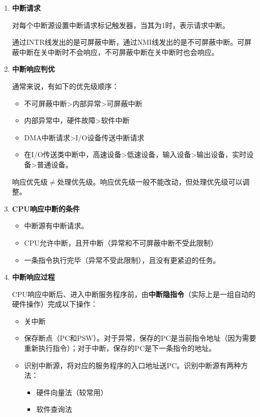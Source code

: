 \documentclass[12pt, a4paper, oneside]{ctexart}
\begin{document}
\begin{enumerate}
  \item {\bf 中断请求}
  
  对每个中断源设置中断请求标记触发器，当其为1时，表示请求中断。

  通过INTR线发出的是可屏蔽中断，通过NMI线发出的是不可屏蔽中断。可屏蔽中断在关中断时不会响应，不可屏蔽中断在关中断时也会响应。

  \item {\bf 中断响应判优}
  
  通常来说，有如下的优先级顺序：
  \begin{itemize}
    \item 不可屏蔽中断>内部异常>可屏蔽中断
    \item 内部异常中，硬件故障>软件中断
    \item DMA中断请求>I/O设备传送中断请求
    \item 在I/O传送类中断中，高速设备>低速设备，输入设备>输出设备，实时设备>普通设备。
  \end{itemize}

  响应优先级$\neq$处理优先级。响应优先级一般不能改动，但处理优先级可以调整。

  \item {\bf CPU响应中断的条件}
  
  \begin{itemize}
    \item 中断源有中断请求。
    \item CPU允许中断，且开中断（异常和不可屏蔽中断不受此限制）
    \item 一条指令执行完毕（异常不受此限制），且没有更紧迫的任务。
  \end{itemize}

  \item {\bf 中断响应过程}
  
  CPU响应中断后、进入中断服务程序前，由\textbf{中断隐指令}（实际上是一组自动的硬件操作）完成以下操作：
  \begin{itemize}
    \item 关中断
    \item 保存断点（PC和PSW）。对于异常，保存的PC是当前指令地址（因为需要重新执行指令）；对于中断，保存的PC是下一条指令的地址。
    \item 识别中断源，将对应的服务程序的入口地址送PC。识别中断源有两种方法：
    \begin{itemize}
      \item 硬件向量法（较常用）
      \item 软件查询法
    \end{itemize}
  \end{itemize}


\end{enumerate}
\end{document}
